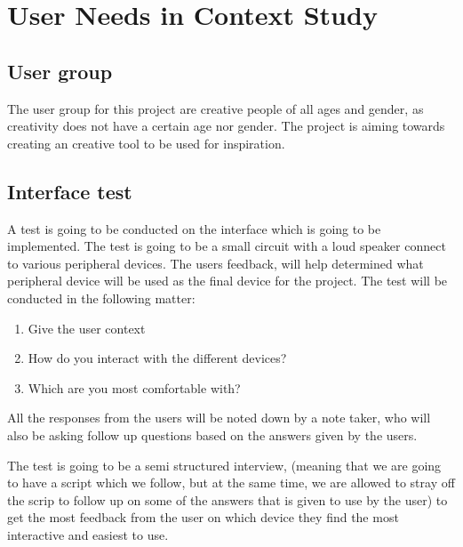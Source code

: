 \chapter{User Needs in Context Study}\label{ch:userstudy}

\section{User group}\label{sec:user}
The user group for this project are creative people of all ages and gender, as creativity does not have a certain age nor gender. 
The project is aiming towards creating an creative tool to be used for inspiration. 

\section{Interface test}\label{sec:interface}
A test is going to be conducted on the interface which is going to be implemented. The test is going to be a small circuit with a loud speaker connect to various peripheral devices.
The users feedback, will help determined what peripheral device will be used as the final device for the project. 
The test will be conducted in the following matter:
\begin{enumerate}
\item Give the user context
\item How do you interact with the different devices?
\item Which are you most comfortable with?
\end{enumerate}
All the responses from the users will be noted down by a note taker, who will also be asking follow up questions based on the answers given by the users. 

The test is going to be a semi structured interview, (meaning that we are going to have a script which we follow, but at the same time, we are allowed to stray off the scrip to follow up on some of the answers that is given to use by the user) to get the most feedback from the user on which device they find the most interactive and easiest to use. 